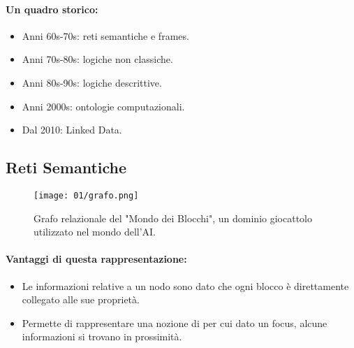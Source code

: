 \paragraph{Un quadro storico:}

\begin{itemize}
  \item Anni 60s-70s: reti semantiche e frames. 
  \item Anni 70s-80s: logiche non classiche. 
  \item Anni 80s-90s: logiche descrittive. 
  \item Anni 2000s: ontologie computazionali. 
  \item Dal 2010: Linked Data.
\end{itemize}

\subsection{Reti Semantiche}


\begin{figure}[h]
    \centering
    \texttt{[image: 01/grafo.png]}
    \caption{Grafo relazionale del "Mondo dei Blocchi", un dominio giocattolo utilizzato nel mondo dell'AI.}
\end{figure}


\paragraph{Vantaggi di questa rappresentazione:}

\begin{itemize}
  \item Le informazioni relative a un nodo sono  dato che ogni blocco è direttamente collegato alle sue proprietà. 
  \item Permette di rappresentare una nozione di  per cui dato un focus, alcune informazioni si trovano in prossimità.
\end{itemize}

